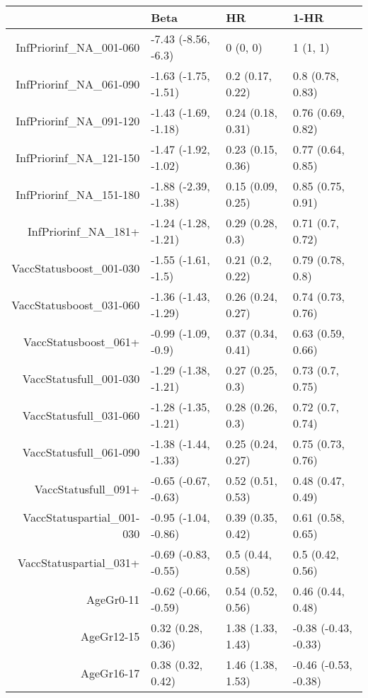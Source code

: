 \begin{table}[ht]
\centering
\begin{tabular}{rlll}
  \hline
 & Beta & HR & 1-HR \\ 
  \hline
InfPriorinf\_NA\_001-060 & -7.43 (-8.56, -6.3) & 0 (0, 0) & 1 (1, 1) \\ 
  InfPriorinf\_NA\_061-090 & -1.63 (-1.75, -1.51) & 0.2 (0.17, 0.22) & 0.8 (0.78, 0.83) \\ 
  InfPriorinf\_NA\_091-120 & -1.43 (-1.69, -1.18) & 0.24 (0.18, 0.31) & 0.76 (0.69, 0.82) \\ 
  InfPriorinf\_NA\_121-150 & -1.47 (-1.92, -1.02) & 0.23 (0.15, 0.36) & 0.77 (0.64, 0.85) \\ 
  InfPriorinf\_NA\_151-180 & -1.88 (-2.39, -1.38) & 0.15 (0.09, 0.25) & 0.85 (0.75, 0.91) \\ 
  InfPriorinf\_NA\_181+ & -1.24 (-1.28, -1.21) & 0.29 (0.28, 0.3) & 0.71 (0.7, 0.72) \\ 
  VaccStatusboost\_001-030 & -1.55 (-1.61, -1.5) & 0.21 (0.2, 0.22) & 0.79 (0.78, 0.8) \\ 
  VaccStatusboost\_031-060 & -1.36 (-1.43, -1.29) & 0.26 (0.24, 0.27) & 0.74 (0.73, 0.76) \\ 
  VaccStatusboost\_061+ & -0.99 (-1.09, -0.9) & 0.37 (0.34, 0.41) & 0.63 (0.59, 0.66) \\ 
  VaccStatusfull\_001-030 & -1.29 (-1.38, -1.21) & 0.27 (0.25, 0.3) & 0.73 (0.7, 0.75) \\ 
  VaccStatusfull\_031-060 & -1.28 (-1.35, -1.21) & 0.28 (0.26, 0.3) & 0.72 (0.7, 0.74) \\ 
  VaccStatusfull\_061-090 & -1.38 (-1.44, -1.33) & 0.25 (0.24, 0.27) & 0.75 (0.73, 0.76) \\ 
  VaccStatusfull\_091+ & -0.65 (-0.67, -0.63) & 0.52 (0.51, 0.53) & 0.48 (0.47, 0.49) \\ 
  VaccStatuspartial\_001-030 & -0.95 (-1.04, -0.86) & 0.39 (0.35, 0.42) & 0.61 (0.58, 0.65) \\ 
  VaccStatuspartial\_031+ & -0.69 (-0.83, -0.55) & 0.5 (0.44, 0.58) & 0.5 (0.42, 0.56) \\ 
  AgeGr0-11 & -0.62 (-0.66, -0.59) & 0.54 (0.52, 0.56) & 0.46 (0.44, 0.48) \\ 
  AgeGr12-15 & 0.32 (0.28, 0.36) & 1.38 (1.33, 1.43) & -0.38 (-0.43, -0.33) \\ 
  AgeGr16-17 & 0.38 (0.32, 0.42) & 1.46 (1.38, 1.53) & -0.46 (-0.53, -0.38) \\ 

\end{tabular}
\end{table}
